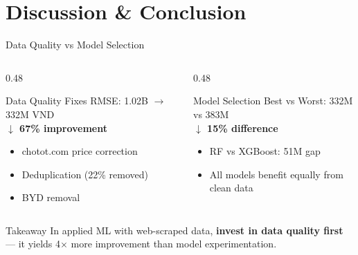 \documentclass[aspectratio=169]{beamer}
\begin{document}


    \section{Discussion \& Conclusion}

    \begin{frame}{Data Quality vs Model Selection}
        \begin{columns}[T]
            \begin{column}{0.48\textwidth}
                \begin{block}{Data Quality Fixes}
                    RMSE: 1.02B $\to$ 332M VND\\
                    \textcolor{fptgood}{\textbf{$\downarrow$ 67\% improvement}}
                    \begin{itemize}
                        \small
                        \item chotot.com price correction
                        \item Deduplication (22\% removed)
                        \item BYD removal
                    \end{itemize}
                \end{block}
            \end{column}
            \begin{column}{0.48\textwidth}
                \begin{block}{Model Selection}
                    Best vs Worst: 332M vs 383M\\
                    \textcolor{fptaccent}{\textbf{$\downarrow$ 15\% difference}}
                    \begin{itemize}
                        \small
                        \item RF vs XGBoost: 51M gap
                        \item All models benefit equally from clean data
                    \end{itemize}
                \end{block}
            \end{column}
        \end{columns}

        \vspace{1em}
        \begin{alertblock}{Takeaway}
            In applied ML with web-scraped data, \textbf{invest in data quality first} --- it yields 4$\times$ more improvement than model experimentation.
        \end{alertblock}
    \end{frame}
\end{document}

